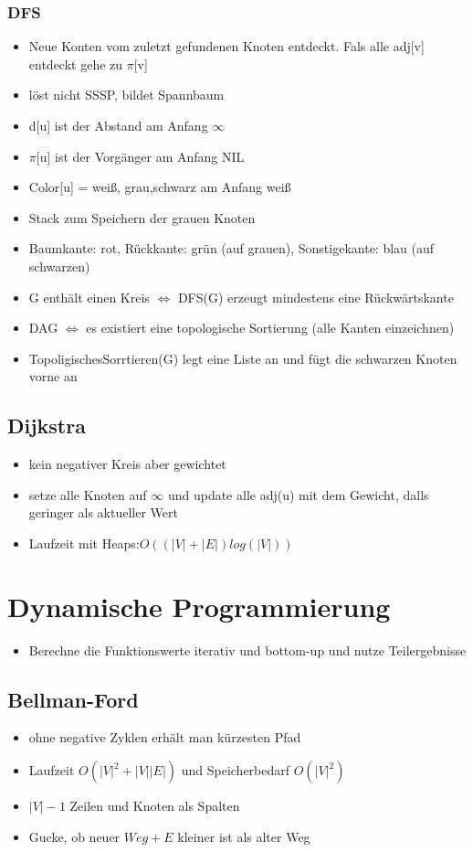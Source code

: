 \documentclass{article}
\begin{document}
\subsubsection{DFS}
\begin{itemize}
\item Neue Konten vom zuletzt gefundenen Knoten entdeckt. Fals alle adj[v] entdeckt gehe zu $\pi$[v]
\item l{\"o}st nicht SSSP, bildet Spannbaum
\item d[u] ist der Abstand am Anfang $\infty$
\item $\pi$[u] ist der Vorg{\"a}nger am Anfang NIL
\item Color[u] = wei\ss, grau,schwarz am Anfang wei\ss
\item Stack zum Speichern der grauen Knoten
\item Baumkante: rot, R{\"u}ckkante: gr{\"u}n (auf grauen), Sonstigekante: blau (auf schwarzen)
\item G enth{\"a}lt einen Kreis $\Leftrightarrow$ DFS(G) erzeugt mindestens eine R{\"u}ckw{\"a}rtskante
\item DAG $\Leftrightarrow$ es existiert eine topologische Sortierung (alle Kanten einzeichnen)
\item TopoligischesSorrtieren(G) legt eine Liste an und f{\"u}gt die schwarzen Knoten vorne an
\end{itemize}

\subsection{Dijkstra}
\begin{itemize}
\item kein negativer Kreis aber gewichtet
\item setze alle Knoten auf $\infty$ und update alle adj(u) mit dem Gewicht, dalls geringer als aktueller Wert
\item Laufzeit mit Heaps:$O((|V|+|E|)log(|V|))$
\end{itemize}


\section{Dynamische Programmierung}
\begin{itemize}
\item Berechne die Funktionswerte iterativ und bottom-up und nutze Teilergebnisse
\end{itemize}

\subsection{Bellman-Ford}
\begin{itemize}
\item ohne negative Zyklen erh{\"a}lt man k{\"u}rzesten Pfad
\item  Laufzeit $O(|V|^2+|V||E|)$ und Speicherbedarf $O(|V|^2)$
\item $|V|-1$ Zeilen und Knoten als Spalten 
\item Gucke, ob neuer $Weg+E$ kleiner ist als alter Weg
\end{itemize}
\end{document}
